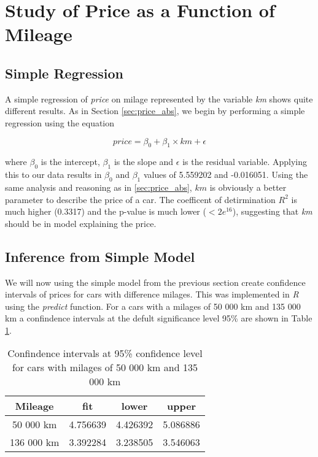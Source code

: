 \section{Study of Price as a Function of Mileage} %
\label{sec:price_km}

\subsection{Simple Regression} %
\label{sub:simple_regression}

A simple regression of \textit{price} on milage represented by the variable \textit{km} shows quite different results. As in Section \ref{sec:price_abs}, we begin by performing a simple regression using the equation

\begin{equation}\label{eq:price_km}
	price = \beta_0 + \beta_1 \times km + \epsilon
\end{equation}

\noindent
where $\beta_0$ is the intercept, $\beta_1$ is the slope and $\epsilon$ is 
the residual variable. Applying this to our data results in $\beta_0$ and 
$\beta_1$ values of 5.559202 and -0.016051. Using the same analysis and 
reasoning as in \ref{sec:price_abs}, $km$ is obviously a better parameter to 
describe the price of a car. The coefficent of detirmination $R^2$ is much 
higher (0.3317) and the p-value is much lower ($<2e^{16}$), suggesting that 
\textit{km} should be in model explaining the price.

\subsection{Inference from Simple Model} %
\label{sub:inference_from_simple_model}

We will now using the simple model from the previous section create confidence intervals of prices for cars with difference milages. This was implemented in \textit{R} using the \textit{predict} function. For a cars with a milages of 50 000 km and 135 000 km a confindence intervals at the defult significance level 95\% are shown in Table \ref{tab:confint_km}.

\begin{table}[H]
\centering
\begin{tabular}{||c |c c c||} 
 \hline
 Mileage & fit & lower & upper \\ [0.5ex]
 \hline
 50 000 km & 4.756639 & 4.426392 & 5.086886 \\ 
 136 000 km & 3.392284 & 3.238505 & 3.546063 \\
 \hline
\end{tabular}
\caption{Confindence intervals at 95\% confidence level for cars with milages of 50 000 km and 135 000 km}
\label{tab:confint_km}
\end{table}

